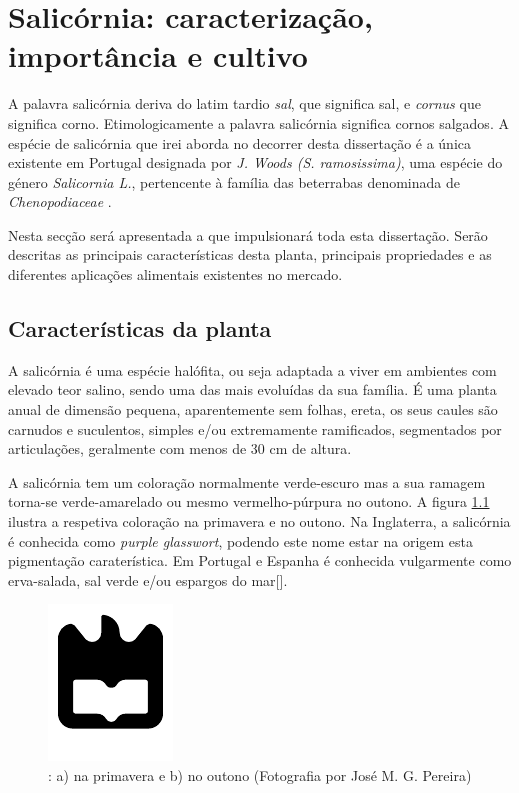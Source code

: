 
\chapter{Salicórnia: caracterização, importância e cultivo}

A palavra salicórnia deriva do latim tardio \textit{sal}, que significa sal, e \textit{cornus} que significa corno. Etimologicamente a palavra salicórnia significa cornos salgados\cite{chambers}. A espécie de salicórnia que irei aborda no decorrer desta dissertação é a única existente em Portugal designada por \sr \textit{J. Woods (S. ramosissima)}\cite{JoaoSilva}, uma espécie do género \textit{Salicornia L.}, pertencente à família das beterrabas denominada de \textit{Chenopodiaceae} \cite{chenopodiaceae}.

Nesta secção será apresentada a \sr que impulsionará toda esta dissertação. Serão descritas as principais características desta planta, principais propriedades e as diferentes aplicações alimentais existentes no mercado. 

\section{Características da planta}


A salicórnia é uma espécie halófita, ou seja adaptada a viver em ambientes com elevado teor salino\cite{ferri}, sendo uma das mais evoluídas da sua família. É uma planta anual de dimensão pequena, aparentemente sem folhas, ereta, os seus caules são carnudos e suculentos, simples e/ou extremamente ramificados, segmentados por articulações\cite{Silva2000}, geralmente com menos de 30 cm de altura\cite{overviewsal}.

A salicórnia tem um coloração normalmente verde-escuro mas a sua ramagem torna-se  verde-amarelado ou mesmo vermelho-púrpura no outono. A figura \ref{primoutono} ilustra a respetiva coloração na primavera e no outono. Na Inglaterra, a salicórnia é conhecida como \textit{purple glasswort}, podendo este nome estar na origem esta pigmentação caraterística. Em Portugal e Espanha é conhecida vulgarmente como erva-salada, sal verde e/ou espargos do mar[]. 


\begin{figure}[!htb]
	\centering
	\includegraphics{uaLogoNew.pdf}
	\caption{\sr: a) na primavera e b) no outono (Fotografia por José M. G. Pereira)}
	\label{primoutono}
\end{figure}


